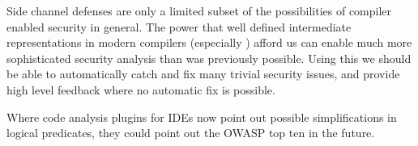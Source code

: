 Side channel defenses are only a limited subset of the possibilities of compiler enabled security in general.
The power that well defined intermediate representations in modern compilers (especially \ir{}) afford us can enable much more sophisticated security analysis than was previously possible.
Using this we should be able to automatically catch and fix many trivial security issues, and provide high level feedback where no automatic fix is possible.

Where code analysis plugins for IDEs now point out possible simplifications in logical predicates, they could point out the OWASP top ten in the future.
